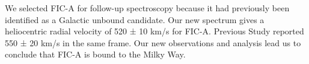 We selected FIC-A for follow-up spectroscopy because it had previously been identified as a Galactic unbound candidate.
Our new spectrum gives a heliocentric radial velocity of 520 ± 10 km/s for FIC-A. Previous Study reported 550 ± 20 km/s in the same frame.
Our new observations and analysis lead us to conclude that FIC-A is bound to the Milky Way.
